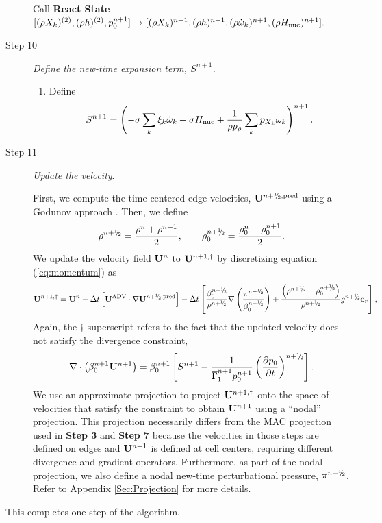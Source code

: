 \begin{description}
Call {\bf React State}$[(\rho X_k)^{(2)},(\rho h)^{(2)}, p_0^{n+1}] \rightarrow [(\rho X_k)^{n+1}, (\rho h)^{n+1}, (\rho \dot\omega_k)^{n+1}, (\rho H_{\rm nuc})^{n+1}].$

\item[Step 10] {\em Define the new-time expansion term, $S^{n+1}$.}

\begin{enumerate}
\renewcommand{\theenumi}{{\bf \Alph{enumi}}}
\item Define
\begin{equation}
  S^{n+1} =  \left(-\sigma  \sum_k  \xi_k \omegadot_k  + \sigma \Hnuc +
  \frac{1}{\rho p_\rho} \sum_k p_{X_k}  \omegadot_k\right)^{n+1}.
\end{equation}

\end{enumerate}


\item[Step 11] {\em Update the velocity}.

First, we compute the time-centered edge velocities, $\Ub^{\nph,\pred}$
using a Godunov approach \citep{XRB_III}. Then, we define
\begin{equation}
\rho^\nph = \frac{\rho^n + \rho^{n+1}}{2}, \qquad \rho_0^\nph = \frac{\rho_0^n + \rho_0^{n+1}}{2}.
\end{equation}
We update the velocity field ${\bf{U}}^n$ to ${\bf{U}}^{n+1,\dagger}$ by discretizing
equation (\ref{eq:momentum}) as
\begin{equation}
\Ub^{n+1,\dagger}
= \Ub^n - \dt \left[\uadvtwo \cdot \nabla \Ub^{\nph,\pred} \right]
 - \dt \left[ \frac{\beta_0^\nph}{\rho^\nph} \nabla \left( \frac{\pi^\nmh}{\beta_0^\nmh} \right) + \frac{\left(\rho^\nph-\rho_0^\nph\right)}{\rho^\nph} g^{\nph} \eb_r \right],
\end{equation}
Again, the $\dagger$ superscript refers
to the fact that the updated velocity does not satisfy the divergence constraint,
\begin{equation}
\nabla \cdot \left(\beta_0^{n+1} \Ub^{n+1} \right) = \beta_0^{n+1} \left[ S^{n+1} - \frac{1}{\gammaonebar^{n+1}p_0^{n+1}}\left(\frac{\partial p_0}{\partial t}\right)^{\nph}\right].\label{eq:div3}
\end{equation}
We use an approximate projection to project ${\bf{U}}^{n+1,\dagger}$ onto the space of velocities that satisfy the constraint to obtain ${\bf{U}}^{n+1}$ using a ``nodal'' projection.
This projection necessarily differs from the MAC projection used in
{\bf Step 3} and {\bf Step 7} because the velocities in those steps are defined
on edges and ${\bf{U}}^{n+1}$ is defined at cell centers, requiring different divergence
and gradient operators.
Furthermore, as part of the nodal projection, we also define a nodal new-time perturbational pressure, $\pi^\nph$.
Refer to Appendix \ref{Sec:Projection} for more details.

\end{description}
This completes one step of the algorithm.

